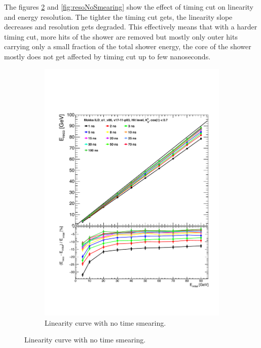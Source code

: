 The figures \ref{fig:linearityNoSmearing} and \ref{fig:resoNoSmearing} show the effect of timing cut on linearity and energy resolution. The tighter the timing cut gets, the linearity slope decreases and resolution gets degraded. This effectively means that with a harder timing cut, more hits of the shower are removed but mostly only outer hits carrying only a small fraction of the total shower energy, the core of the shower mostly does not get affected by timing cut up to few nanoseconds.

\begin{figure}[htbp!]
  \centering
  \begin{subfigure}[t]{0.45\textwidth}
    \centering
    \includegraphics[width=1\linewidth]{chap6/fig_TimingILD/NoSmearing/Linearity_TimeCuts_noSmearing}
    \caption{Linearity curve with no time smearing.} \label{fig:linearityNoSmearing}
  \end{subfigure}

\end{figure}
